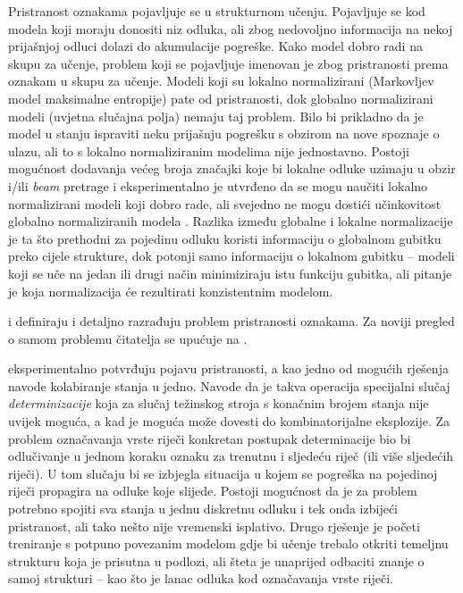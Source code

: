Pristranost oznakama  pojavljuje se u strukturnom učenju.
Pojavljuje se kod modela koji moraju donositi niz odluka, ali zbog nedovoljno
informacija na nekoj prijašnjoj odluci dolazi do akumulacije pogreške. Kako
model dobro radi na skupu za učenje, problem koji se pojavljuje imenovan je zbog
pristranosti prema oznakam u skupu za učenje. Modeli koji su lokalno
normalizirani (Markovljev model maksimalne entropije) pate od pristranosti, dok
globalno normalizirani modeli (uvjetna slučajna polja) nemaju taj problem. Bilo
bi prikladno da je model u stanju ispraviti neku prijašnju pogrešku s obzirom na
nove spoznaje o ulazu, ali to s lokalno normaliziranim modelima nije
jednostavno. Postoji mogućnost dodavanja većeg broja značajki koje bi lokalne
odluke uzimaju u obzir i/ili \textit{beam} pretrage i eksperimentalno je
utvrđeno da se mogu naučiti lokalno normalizirani modeli koji dobro rade, ali
svejedno ne mogu dostići učinkovitost globalno normaliziranih modela
\citep{liang2008structure}. Razlika između globalne i lokalne normalizacije je
ta što prethodni za pojedinu odluku koristi informaciju o globalnom gubitku
preko cijele strukture, dok potonji samo informaciju o lokalnom gubitku --
modeli koji se uče na jedan ili drugi način minimiziraju istu funkciju gubitka,
ali pitanje je koja normalizacija će rezultirati konzistentnim modelom.

\citet*{lafferty2001conditional} i \citet*{leon1991approche} definiraju i
detaljno razrađuju problem pristranosti oznakama. Za noviji pregled o samom
problemu čitatelja se upućuje na \citep{andor2016globally}.

\citet*{lafferty2001conditional} eksperimentalno potvrđuju pojavu pristranosti,
a kao jedno od mogućih rješenja navode kolabiranje stanja u jedno. Navode da je
takva operacija specijalni slučaj \emph{determinizacije} koja za slučaj
težinskog stroja s konačnim brojem stanja nije uvijek moguća, a kad je moguća
može dovesti do kombinatorijalne eksplozije. Za problem označavanja vrste riječi
konkretan postupak determinacije bio bi odlučivanje u jednom koraku oznaku za
trenutnu i sljedeću riječ (ili više sljedećih riječi). U tom slučaju bi se
izbjegla situacija u kojem se pogreška na pojedinoj riječi propagira na odluke
koje slijede. Postoji mogućnost da je za problem potrebno spojiti sva stanja u
jednu diskretnu odluku i tek onda izbijeći pristranost, ali tako nešto nije
vremenski isplativo. Drugo rješenje je početi treniranje s potpuno povezanim
modelom gdje bi učenje trebalo otkriti temeljnu strukturu koja je prisutna u
podlozi, ali šteta je unaprijed odbaciti znanje o samoj strukturi -- kao što je
lanac odluka kod označavanja vrste riječi.

